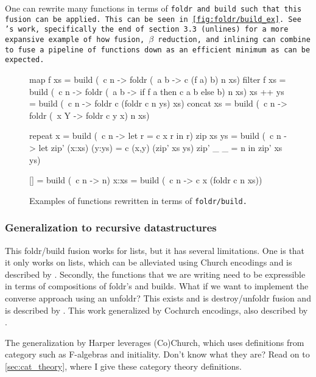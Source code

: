 One can rewrite many functions in terms of \tt{foldr} and \tt{build} such that this fusion can be applied. This can be seen in \autoref{fig:foldr/build_ex}.
See \cite{Gill1993}'s work, specifically the end of section 3.3 (\tt{unlines}) for a more expansive example of how fusion, $\beta$ reduction, and inlining can combine to fuse a pipeline of functions down as an efficient minimum as can be expected.
\begin{figure}[ht]
    \centering
    \begin{code}
map f xs    = build (\ c n -> foldr (\ a b -> c (f a) b) n xs)
filter f xs = build (\ c n -> foldr (\ a b -> if f a then c a b else b) n xs)
xs ++ ys    = build (\ c n -> foldr c (foldr c n ys) xs)
concat xs   = build (\ c n -> foldr (\ x Y -> foldr c y x) n xs)

repeat x    = build (\ c n -> let r = c x r in r)
zip xs ys   = build (\ c n -> let zip' (x:xs) (y:ys) = c (x,y) (zip' xs ys)
                                  zip' _      _      = n
                                  in zip' xs ys)

[]         = build (\ c n -> n)
x:xs       = build (\ c n -> c x (foldr c n xs))
    \end{code}
    \caption{Examples of functions rewritten in terms of \tt{foldr/build}. \citep{Gill1993}}
    \label{fig:foldr/build_ex}
\end{figure}



\subsubsection{Generalization to recursive datastructures}
This foldr/build fusion works for lists, but it has several limitations.
One is that it only works on lists, which can be alleviated using Church encodings and is described by \cite{Harper2011}.
Secondly, the functions that we are writing need to be expressible in terms of compositions of foldr's and builds. What if we want to implement the converse approach using an unfoldr?
This exists and is destroy/unfoldr fusion and is described by \cite{Coutts2007}.
This work generalized by Cochurch encodings, also described by \cite{Harper2011}.

The generalization by Harper leverages (Co)Church, which uses definitions from category such as F-algebras and initiality.
Don't know what they are? Read on to \autoref{sec:cat_theory}, where I give these category theory definitions.

